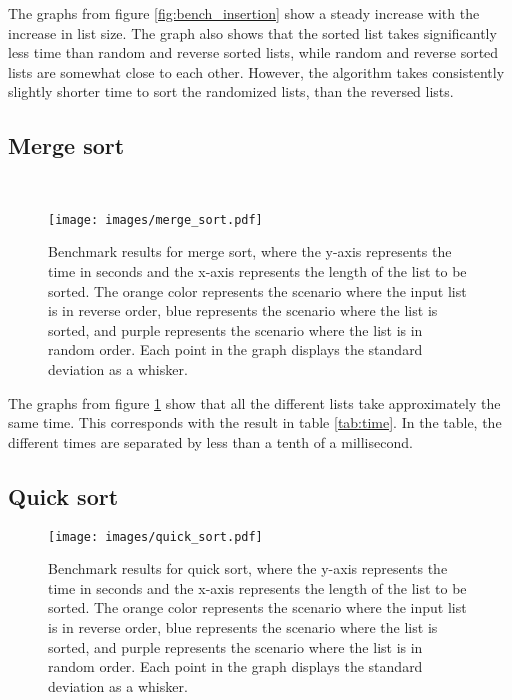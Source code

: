 \documentclass[sigconf, nonacm, natbib, screen, balance=False, 9.5pt]{acmart}
\begin{document}
The graphs from figure \ref{fig:bench_insertion} show a steady increase with the increase in list size. The graph also shows that the sorted list takes significantly less time than random and reverse sorted lists, while random and reverse sorted lists are somewhat close to each other. However, the algorithm takes consistently slightly shorter time to sort the randomized lists, than the reversed lists.

\subsection{Merge sort}

\

\begin{figure}[htp]%
  \centering
  \texttt{[image: images/merge\_sort.pdf]}
  \caption{Benchmark results for merge sort, where the y-axis represents the time in seconds and the x-axis represents the length of the list to be sorted. The orange color represents the scenario where the input list is in reverse order, blue represents the scenario where the list is sorted, and purple represents the scenario where the list is in random order. Each point in the graph displays the standard deviation as a whisker.}
  \label{fig:bench_merge}
\end{figure}

The graphs from figure \ref{fig:bench_merge} show that all the different lists take approximately the same time. This corresponds with the result in table \ref{tab:time}. In the table, the different times are separated by less than a tenth of a millisecond.

\subsection{Quick sort}

\begin{figure}[H] %
  \centering
  \texttt{[image: images/quick\_sort.pdf]}
  \caption{Benchmark results for quick sort, where the y-axis represents the time in seconds and the x-axis represents the length of the list to be sorted. The orange color represents the scenario where the input list is in reverse order, blue represents the scenario where the list is sorted, and purple represents the scenario where the list is in random order. Each point in the graph displays the standard deviation as a whisker.}
  \label{fig:bench_quick}
\end{figure}
\end{document}
